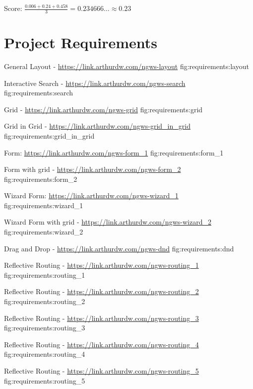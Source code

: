 Score: $\frac{0.006 + 0.24 + 0.458}{3} = 0.234666\dots \approx 0.23$


\chapter{Project Requirements}

{General Layout - \url{https://link.arthurdw.com/ngws-layout}}
{fig:requirements:layout}

{Interactive Search - \url{https://link.arthurdw.com/ngws-search}}
{fig:requirements:search}

{Grid - \url{https://link.arthurdw.com/ngws-grid}}
{fig:requirements:grid}

{Grid in Grid - \url{https://link.arthurdw.com/ngws-grid_in_grid}}
{fig:requirements:grid_in_grid}

{Form: \url{https://link.arthurdw.com/ngws-form_1}}
{fig:requirements:form_1}

{Form with grid - \url{https://link.arthurdw.com/ngws-form_2}}
{fig:requirements:form_2}

{Wizard Form: \url{https://link.arthurdw.com/ngws-wizard_1}}
{fig:requirements:wizard_1}

{Wizard Form with grid - \url{https://link.arthurdw.com/ngws-wizard_2}}
{fig:requirements:wizard_2}

{Drag and Drop - \url{https://link.arthurdw.com/ngws-dnd}}
{fig:requirements:dnd}

{Reflective Routing - \url{https://link.arthurdw.com/ngws-routing_1}}
{fig:requirements:routing_1}

{Reflective Routing - \url{https://link.arthurdw.com/ngws-routing_2}}
{fig:requirements:routing_2}

{Reflective Routing - \url{https://link.arthurdw.com/ngws-routing_3}}
{fig:requirements:routing_3}

{Reflective Routing - \url{https://link.arthurdw.com/ngws-routing_4}}
{fig:requirements:routing_4}

{Reflective Routing - \url{https://link.arthurdw.com/ngws-routing_5}}
{fig:requirements:routing_5}

